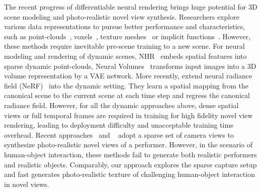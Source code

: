 The recent progress of differentiable neural rendering brings huge potential for 3D scene modeling and photo-realistic novel view synthesis. Researchers explore various data representations to pursue better performance and characteristics, such as point-clouds~\cite{Wu_2020_CVPR,aliev2019neural,suo2020neural3d}, voxels~\cite{lombardi2019neural}, texture meshes~\cite{thies2019deferred,liu2019neural} or implicit functions~\cite{park2019deepsdf,nerf,meng2021gnerf,chen2021mvsnerf,wang2021mirrornerf,luo2021convolutional}. 
%
However, these methods require inevitable pre-scene training to a new scene.
%
For neural modeling and rendering of dynamic scenes, NHR~\cite{Wu_2020_CVPR} embeds spatial features into sparse dynamic point-clouds, Neural Volumes~\cite{NeuralVolumes} transforms input images into a 3D volume representation by a VAE network.
% 
More recently, \cite{park2020deformable,pumarola2020d,li2020neural,xian2020space,tretschk2020non,peng2021neural,zhang2021editable} extend neural radiance field (NeRF)~\cite{nerf} into the dynamic setting. 
%
They learn a spatial mapping from the canonical scene to the current scene at each time step and regress the canonical radiance field. 
% 
However, for all the dynamic approaches above, dense spatial views or full temporal frames are required in training for high fidelity novel view rendering, leading to deployment difficulty and unacceptable training time overhead. Recent approaches~\cite{peng2021neural} and ~\cite{NeuralHumanFVV2021CVPR} adopt a sparse set of camera views to synthesize photo-realistic novel views of a performer. However, in the scenario of human-object interaction, these methods fail to generate both realistic performers and realistic objects.
Comparably, our approach explores the sparse capture setup and fast generates photo-realistic texture of challenging human-object interaction in novel views.

